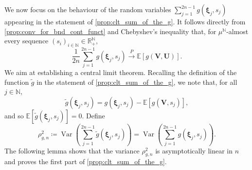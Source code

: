 \documentclass[11pt,a4paper,oneside]{article}
\theoremstyle{definition}
\theoremstyle{remark}
\def\N{\mathbb{N}}
\def\E{\mathbb{E}}
\def\R{\mathbb{R}}
\DeclareMathOperator{\Var}{Var}
\begin{document}
We now focus on the behaviour of the random variables $\sum_{j=1}^{2n-1}g\left(\bm \xi_j,s_j\right)$ appearing in the statement of \cref{prop:clt_sum_of_the_g}. It follows directly from \cref{prop:conv_for_bnd_cont_funct} and 
Chebyshev's inequality that, for $\mu^{\N}$-almost every sequence $(s_i)_{{i\in\N}}\in\R^{\N}_{+}$,
\begin{equation}
	\frac{1}{2n} \sum_{j=1}^{2n-1}g\left(\bm \xi_j,s_j\right) \xrightarrow{P} \E \left[g \left( \bm V, \bm U \right)\right].
\end{equation} 
We aim at establishing a central limit theorem. 
Recalling the definition of the function $\tilde g$ in the statement of \cref{prop:clt_sum_of_the_g}, we note that, for all $j \in \mathbb{N}$,
\begin{equation}
\tilde{g} \left(\bm \xi_j,s_j \right) = g\left(\bm \xi_j,s_j \right) - \E[g\left(\bm V, s_j\right)],
\end{equation}
and so $\E \left[\tilde{g}  \left(\bm \xi_j,s_j \right) \right] = 0$.
Define
\begin{equation}
	\rho_{g,n}^2 \coloneqq \Var \left( \sum_{j=1}^{2n-1}\tilde{g} \left(\bm \xi_j,s_j\right) \right) =  \Var \left( \sum_{j=1}^{2n-1}g\left(\bm \xi_j,s_j\right) \right).
\end{equation}
The following lemma shows that the variance $\rho_{g,n}^2$ is asymptotically linear in $n$ and proves the first part of \cref{prop:clt_sum_of_the_g}.  
\end{document}
